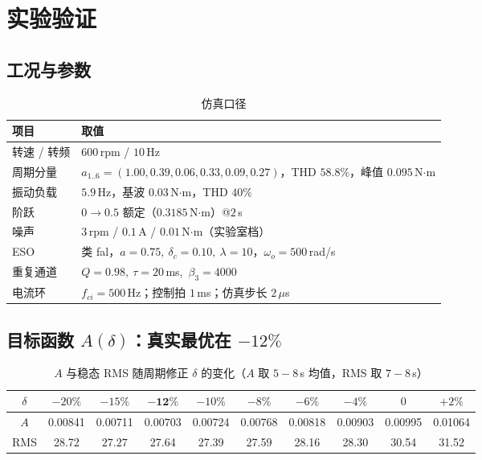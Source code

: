 \documentclass[UTF8,fontset=windows,a4paper,11pt]{ctexart}
\begin{document}
\section{实验验证}

\subsection{工况与参数}
\begin{table}[h]
\centering
\caption{仿真口径}
\begin{tabular}{@{}ll@{}}
\toprule
项目 & 取值 \\
\midrule
转速 / 转频 & $600$\,rpm / $10$\,Hz \\
周期分量 & $a_{1..6}=(1.00,0.39,0.06,0.33,0.09,0.27)$，THD $58.8\%$，峰值 $0.095$\,N$\cdot$m \\
振动负载 & $5.9$\,Hz，基波 $0.03$\,N$\cdot$m，THD $40\%$ \\
阶跃 & $0\to0.5$ 额定（$0.3185$\,N$\cdot$m）@$2$\,s \\
噪声 & $3$\,rpm / $0.1$\,A / $0.01$\,N$\cdot$m（实验室档） \\
ESO & 类 fal，$a=0.75,\ \delta_c=0.10,\ \lambda=10$，$\omega_o=500$\,rad/s \\
重复通道 & $Q=0.98,\ \tau=20$\,ms,\ $\beta_3=4000$ \\
电流环 & $f_{ci}=500$\,Hz；控制拍 $1$\,ms；仿真步长 $2\,\mu$s \\
\bottomrule
\end{tabular}
\end{table}

\subsection{目标函数 $A(\delta)$：真实最优在 $-12\%$}
\begin{table}[h]
\centering
\caption{$A$ 与稳态 RMS 随周期修正 $\delta$ 的变化（$A$ 取 $5\!-\!8$\,s 均值，RMS 取 $7\!-\!8$\,s）}
\begin{tabular}{@{}cccccccccc@{}}
\toprule
$\delta$ & $-20\%$ & $-15\%$ & $\mathbf{-12\%}$ & $-10\%$ & $-8\%$ & $-6\%$ & $-4\%$ & $0$ & $+2\%$ \\
\midrule
$A$ & 0.00841 & 0.00711 & $\mathbf{0.00703}$ & 0.00724 & 0.00768 & 0.00818 & 0.00903 & 0.00995 & 0.01064 \\
RMS & 28.72 & $\mathbf{27.27}$ & 27.64 & 27.39 & 27.59 & 28.16 & 28.30 & 30.54 & 31.52 \\
\bottomrule
\end{tabular}
\end{table}
\end{document}
